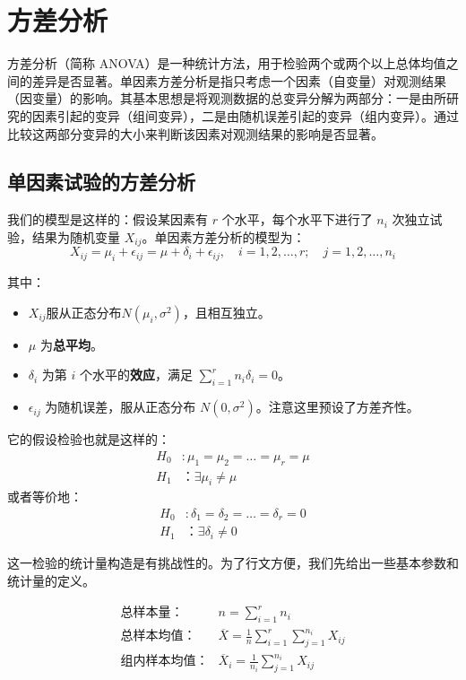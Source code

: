
\section{方差分析}
方差分析（简称 ANOVA）是一种统计方法，用于检验两个或两个以上总体均值之间的差异是否显著。单因素方差分析是指只考虑一个因素（自变量）对观测结果（因变量）的影响。其基本思想是将观测数据的总变异分解为两部分：一是由所研究的因素引起的变异（组间变异），二是由随机误差引起的变异（组内变异）。通过比较这两部分变异的大小来判断该因素对观测结果的影响是否显著。
\subsection{单因素试验的方差分析}

我们的模型是这样的：假设某因素有 $r$ 个水平，每个水平下进行了 $n_i$ 次独立试验，结果为随机变量 $X_{ij}$。单因素方差分析的模型为：
\[
X_{ij}=\mu_i+\epsilon_{ij}=\mu+\delta_i+\epsilon_{ij},\quad i=1,2,\ldots,r;\quad j=1,2,\ldots,n_i
\]

其中：
\begin{itemize}
\item $X_{ij}$服从正态分布$N(\mu_i,\sigma^2)$，且相互独立。
\item $\mu$ 为\textbf{总平均}。
\item $\delta_i$ 为第 $i$ 个水平的\textbf{效应}，满足 $\sum_{i=1}^r n_i \delta_i = 0$。
\item $\epsilon_{ij}$ 为随机误差，服从正态分布 $N(0, \sigma^2)$。注意这里预设了方差齐性。
\end{itemize}

它的假设检验也就是这样的：
\begin{align*}
H_0&: \mu_1 = \mu_2 = \dots = \mu_r = \mu\\
H_1&：\exists \mu_i \neq \mu
\end{align*}
或者等价地：
\begin{align*}
H_0&: \delta_1 = \delta_2 = \dots = \delta_r = 0\\
H_1&：\exists \delta_i \neq 0
\end{align*}

这一检验的统计量构造是有挑战性的。为了行文方便，我们先给出一些基本参数和统计量的定义。

\begin{align*}
\text{总样本量：} &n = \sum_{i=1}^r n_i\\
\text{总样本均值：} &\overline{X} = \frac{1}{n}\sum_{i=1}^r\sum_{j=1}^{n_i}X_{ij} \\
\text{组内样本均值：} &\overline{X}_i = \frac{1}{n_i}\sum_{j=1}^{n_i}X_{ij} \\
\end{align*}

